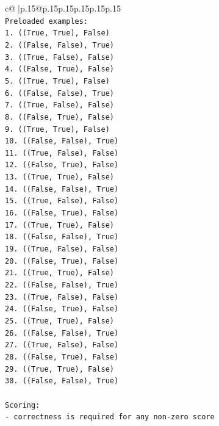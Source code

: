\documentclass{article}
\begin{document}
{\begin{supertabular}{c@{$\;$}|p{.15\linewidth}@{}p{.15\linewidth}p{.15\linewidth}p{.15\linewidth}p{.15\linewidth}p{.15\linewidth}}
{{{\\ 
\texttt{Preloaded examples:} \\
\texttt{1. ((True, True), False)} \\
\texttt{2. ((False, False), True)} \\
\texttt{3. ((True, False), False)} \\
\texttt{4. ((False, True), False)} \\
\texttt{5. ((True, True), False)} \\
\texttt{6. ((False, False), True)} \\
\texttt{7. ((True, False), False)} \\
\texttt{8. ((False, True), False)} \\
\texttt{9. ((True, True), False)} \\
\texttt{10. ((False, False), True)} \\
\texttt{11. ((True, False), False)} \\
\texttt{12. ((False, True), False)} \\
\texttt{13. ((True, True), False)} \\
\texttt{14. ((False, False), True)} \\
\texttt{15. ((True, False), False)} \\
\texttt{16. ((False, True), False)} \\
\texttt{17. ((True, True), False)} \\
\texttt{18. ((False, False), True)} \\
\texttt{19. ((True, False), False)} \\
\texttt{20. ((False, True), False)} \\
\texttt{21. ((True, True), False)} \\
\texttt{22. ((False, False), True)} \\
\texttt{23. ((True, False), False)} \\
\texttt{24. ((False, True), False)} \\
\texttt{25. ((True, True), False)} \\
\texttt{26. ((False, False), True)} \\
\texttt{27. ((True, False), False)} \\
\texttt{28. ((False, True), False)} \\
\texttt{29. ((True, True), False)} \\
\texttt{30. ((False, False), True)} \\
\\ 
\texttt{Scoring:} \\
\texttt{{-} correctness is required for any non{-}zero score} \\
}}}
\end{supertabular}}
\end{document}

